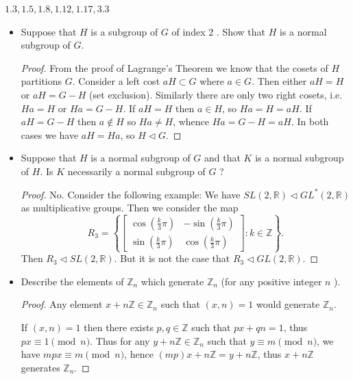 
$1.3,1.5,1.8,1.12,1.17,3.3$

\begin{itemize}
	\item [1.3] Suppose that $H$ is a subgroup of $G$ of index 2 . Show that $H$ is a normal subgroup of $G$.
\begin{proof}
	From the proof of Lagrange's Theorem we know that the cosets of $H$ partitions $G$. Consider a left cost $aH \subset G$ where $a \in G$. Then either  $aH = H$ or $aH = G - H$ (set exclusion). Similarly there are only two right cosets, i.e. $Ha = H$ or $Ha = G - H$. If $aH = H$ then $a \in H$, so $Ha = H = aH$. If $aH = G - H$ then $a \not\in  H$ so $Ha \neq H$, whence $Ha = G - H = aH$. In both cases we have $aH = Ha$, so $H \triangleleft G$.
\end{proof}

	\item [1.5] Suppose that $H$ is a normal subgroup of $G$ and that $K$ is a normal subgroup of $H$. Is $K$ necessarily a normal subgroup of $G$ ?
\begin{proof}
	No. Consider the following example: We have $SL(2, \mathbb{R}) \triangleleft GL^*(2, \mathbb{R})$ as multiplicative groups. Then we consider the map
	\[
		R_3 = \left\{\left[
				\begin{array}{cc} 
			\cos\left( \frac{k}{3} \pi\right)  &- \sin\left( \frac{k}{3} \pi \right) \\
			\sin\left( \frac{k}{3} \pi \right) & \cos\left( \frac{k}{3} \pi \right) 
			\end{array}
	\right] : k \in \mathbb{Z} \right\}
	.\] 
	Then $R_3 \triangleleft SL(2, \mathbb{R})$. But it is not the case that $R_3 \triangleleft GL(2, \mathbb{R})$.
\end{proof}

	\item [1.8] Describe the elements of $\mathbb{Z}_n$ which generate $\mathbb{Z}_n$ (for any positive integer $n$ ).
\begin{proof}
	Any element $x + n\mathbb{Z} \in \mathbb{Z}_n$ such that $(x, n) = 1$ would generate $\mathbb{Z}_n$.

	If $(x, n) = 1$ then there exists $p, q \in \mathbb{Z}$ such that $p x + q n = 1$, thus $px \equiv 1 \pmod n$. Thus for any $y +  n\mathbb{Z} \in \mathbb{Z}_n$ such that $y \equiv m \pmod n$, we have $mpx \equiv m \pmod n$, hence $(mp) x + n \mathbb{Z} = y + n \mathbb{Z}$, thus $x + n\mathbb{Z}$ generates $\mathbb{Z}_n$.


\end{proof}
\end{itemize}
